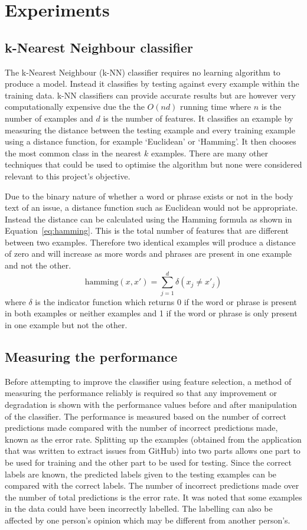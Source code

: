\section{Experiments}
\subsection{k-Nearest Neighbour classifier}
The k-Nearest Neighbour (k-NN) classifier requires no learning algorithm to produce a model. Instead it classifies by testing
against every example within the training data. k-NN classifiers can provide accurate results but are however very
computationally expensive due the the $O(nd)$ running time where $n$ is the number of examples and $d$ is the number of
features. It classifies an example by measuring the distance between the testing example and every training example using a
distance function, for example `Euclidean' or `Hamming'. It then chooses the most common class in the nearest $k$ examples.
There are many other techniques that could be used to optimise the algorithm but none were considered relevant to this project's
objective.

Due to the binary nature of whether a word or phrase exists or not in the body text of an issue, a distance function such as
Euclidean would not be appropriate. Instead the distance can be calculated using the Hamming formula as shown in
Equation~\ref{eq:hamming}. This is the total number of features that are different between two examples. Therefore two identical
examples will produce a distance of zero and will increase as more words and phrases are present in one example and not the
other.
\begin{equation}
    \label{eq:hamming}
    \mathrm{hamming}(x,x') = \sum^d_{j=1} \delta (x_{j} \neq x'_{j})
\end{equation}
where $\delta$ is the indicator function which returns 0 if the word or phrase is present in both examples or neither examples
and 1 if the word or phrase is only present in one example but not the other.

\subsection{Measuring the performance}
Before attempting to improve the classifier using feature selection, a method of measuring the performance reliably is required
so that any improvement or degradation is shown with the performance values before and after manipulation of the classifier. The
performance is measured based on the number of correct predictions made compared with the number of incorrect predictions made,
known as the error rate. Splitting up the examples (obtained from the application that was written to extract issues from
GitHub) into two parts allows one part to be used for training and the other part to be used for testing. Since the correct
labels are known, the predicted labels given to the testing examples can be compared with the correct labels. The number of
incorrect predictions made over the number of total predictions is the error rate. It was noted that some examples in the data
could have been incorrectly labelled. The labelling can also be affected by one person's opinion which may be different from
another person's.

